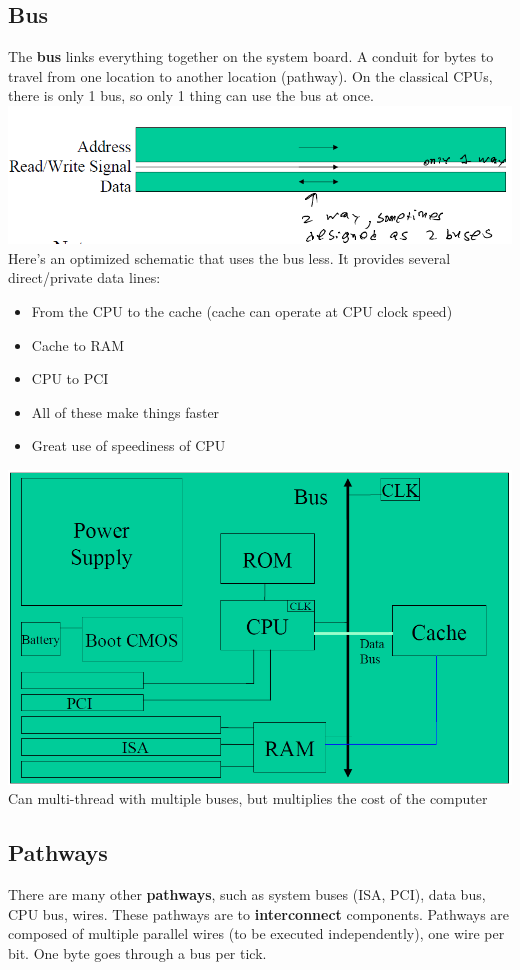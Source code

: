 \documentclass[12 pt]{article}
\begin{document}
	\subsection{Bus}
	The \textbf{bus} links everything together on the system board. A conduit for bytes to travel from one location to another location (pathway). On the classical CPUs, there is only 1 bus, so only 1 thing can use the bus at once.
	\\ \includegraphics[scale=0.6]{bus}
	\\ Here's an optimized schematic that uses the bus less. It provides several direct/private data lines:
	\begin{itemize}
		\item From the CPU to the cache (cache can operate at CPU clock speed)
		\item Cache to RAM
		\item CPU to PCI
		\item All of these make things faster
		\item Great use of speediness of CPU
	\end{itemize} %
	\includegraphics[scale=0.5]{sbo.png}
	\\ Can multi-thread with multiple buses, but multiplies the cost of the computer
	\subsection{Pathways}
	There are many other \textbf{pathways}, such as system buses (ISA, PCI), data bus, CPU bus, wires. These pathways are to \textbf{interconnect} components. Pathways are composed of multiple parallel wires (to be executed independently), one wire per bit. One byte goes through a bus per tick. 
\end{document}
